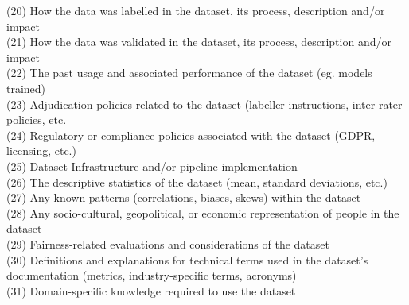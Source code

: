 (20) How the data was labelled in the dataset, its process, description and/or impact\\
(21) How the data was validated in the dataset, its process, description and/or impact\\
(22) The past usage and associated performance of the dataset (eg. models trained)\\
(23) Adjudication policies related to the dataset (labeller instructions, inter-rater policies, etc.\\
(24) Regulatory or compliance policies associated with the dataset (GDPR, licensing, etc.)\\
(25) Dataset Infrastructure and/or pipeline implementation\\
(26) The descriptive statistics of the dataset (mean, standard deviations, etc.)\\
(27) Any known patterns (correlations, biases, skews) within the dataset\\
(28) Any socio-cultural, geopolitical, or economic representation of people in the dataset\\
(29) Fairness-related evaluations and considerations of the dataset\\
(30) Definitions and explanations for technical terms used in the dataset’s documentation (metrics, industry-specific terms, acronyms)\\
(31) Domain-specific knowledge required to use the dataset\\
